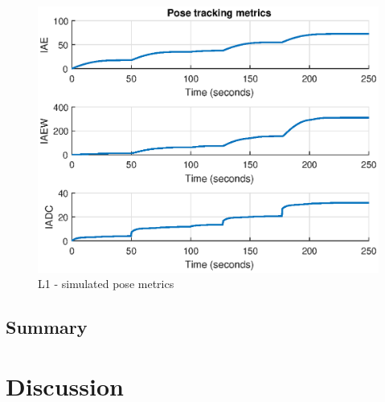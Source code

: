 \begin{figure}[!h]
\centering
\includegraphics[width=1\textwidth]{plots/L1metrics_sim.eps}
\caption{L1 - simulated pose metrics}
\label{fig:simmetric}
\end{figure}

\subsection{Summary}

\section{Discussion}